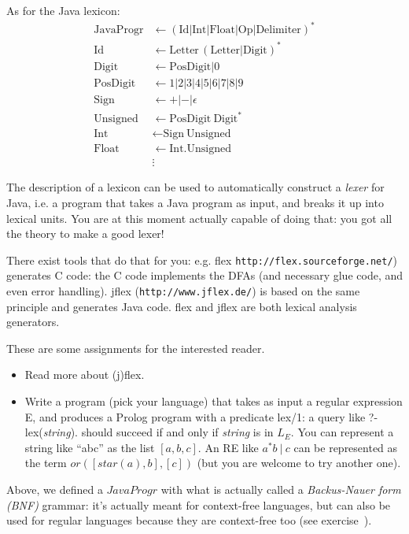 As for the Java lexicon:
\begin{align*}
	\text{JavaProgr} &\leftarrow (\text{Id}|\text{Int}|\text{Float}|\text{Op}|\text{Delimiter})^* \\	
	\text{Id} &\leftarrow \text{Letter}\,(\text{Letter}|\text{Digit})^* \\	
	\text{Digit} &\leftarrow \text{PosDigit}|0 \\
	\text{PosDigit} &\leftarrow 1|2|3|4|5|6|7|8|9 \\
	\text{Sign} &\leftarrow +|-|\epsilon\\
	\text{Unsigned} &\leftarrow \text{PosDigit}~\text{Digit}^* \\
	\text{Int} &\leftarrow \text{Sign}~\text{Unsigned} \\
	\text{Float} &\leftarrow \text{Int}.\text{Unsigned} \\
	&\vdots
\end{align*}

The description of a lexicon can be used to automatically construct a
{\em lexer} for Java, i.e. a program that takes a Java program as input,
and breaks it up into lexical units. You are at this moment actually
capable of doing that: you got all the theory to make a good lexer!\label{flexlabel}

There exist tools that do that for you: e.g. flex
\verb|http://flex.sourceforge.net/|) generates C code: the C code
implements the DFAs (and necessary glue code, and even error
handling). jflex (\verb|http://www.jflex.de/|) is based on the same principle and generates Java code. flex and jflex are both lexical
analysis generators.

\begin{exercise}
These are some assignments for the interested reader.
\begin{itemize}
\item Read more about (j)flex.

\item Write a program (pick your language) that takes as input a regular
expression E, and produces a Prolog program with a predicate lex/1: a
query like ?- lex({\em string}). should succeed if and only if {\em
  string} is in $L_E$. You can represent a string like ``abc'' as the
list $[a,b,c]$. An RE like $a^*b~|~c$ can be represented as the term
$or([star(a),b],[c])$ (but you are welcome to try another one).
\end{itemize}
\end{exercise}

Above, we defined a $JavaProgr$ with what is actually called a
{\em Backus-Nauer form (BNF)} grammar: it's actually
meant for context-free languages, but can also be used for regular
languages because they are context-free too (see exercise~).

